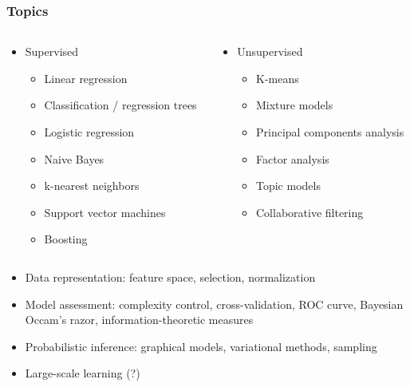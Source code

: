 \documentclass[xcolor=dvipsnames, 9pt]{beamer}
\begin{document}
\begin{frame}
  \frametitle{Topics}

  \begin{columns}[t]
    \begin{column}{0.5\textwidth}

      \begin{itemize}
      \item Supervised
        \begin{itemize}
          \item Linear regression
          \item Classification / regression trees
          \item Logistic regression
          \item Naive Bayes
          \item k-nearest neighbors
          \item Support vector machines
          \item Boosting
        \end{itemize}
      \end{itemize}

    \end{column}
    \begin{column}{0.5\textwidth}

      \begin{itemize}
      \item Unsupervised
        \begin{itemize}
          \item K-means
          \item Mixture models
          \item Principal components analysis
          \item Factor analysis
          \item Topic models
          \item Collaborative filtering
        \end{itemize}
      \end{itemize}

    \end{column}
  \end{columns}

  \pause
  \begin{itemize}
    \item Data representation: feature space, selection, normalization
    \item Model assessment: complexity control, cross-validation, ROC curve, Bayesian Occam's razor, information-theoretic measures
    \pause
    \item Probabilistic inference: graphical models, variational methods, sampling
    \item Large-scale learning (?)
  \end{itemize}

\end{frame}
\end{document}
